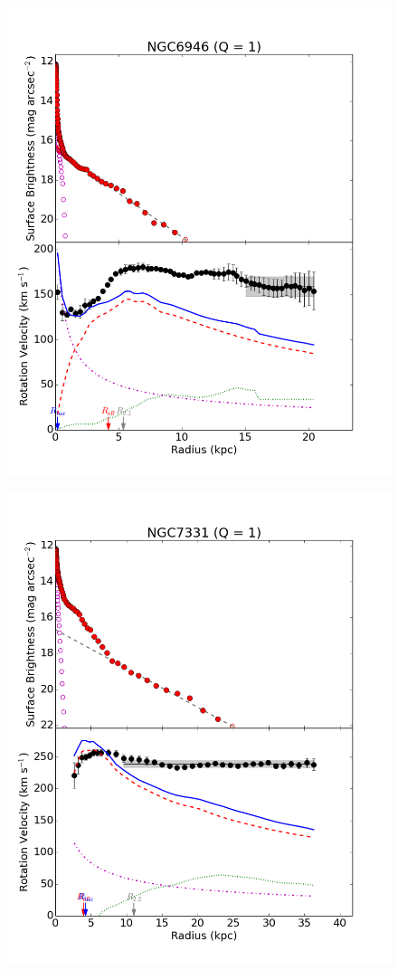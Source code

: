 \begin{figure}[H]
\centering 
\includegraphics[scale=0.5]{pics/lamp2.png}
\end{figure}

\begin{figure}[H]
\centering 
\includegraphics[scale=0.5]{pics/lamp3.png}
\end{figure}
